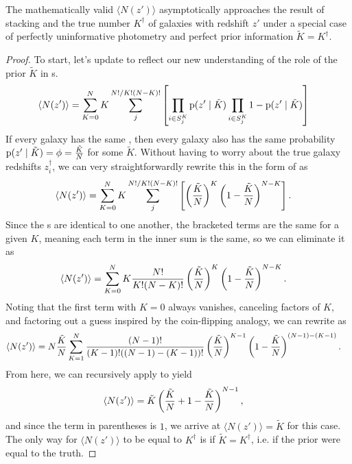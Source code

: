 \begin{theorem}
	\label{thm:uninformative}
	The mathematically valid $\langle N(z') \rangle$ asymptotically approaches the result of stacking and the true number $K^{\dagger}$ of galaxies with redshift $z'$ under a special case of perfectly uninformative photometry and perfect prior information $\tilde{K} = K^{\dagger}$.
\end{theorem}
\begin{proof}
	To start, let's update  to reflect our new understanding of the role of the prior $\tilde{K}$ in \pzpdf s.
	\begin{align}
	\label{eqn:proofwithprior1}
	\langle N(z') \rangle &= \sum_{K = 0}^{N} K \sum_{j}^{N! / K! (N - K)!} \left[ \prod_{i \in S^{K}_{j}} \mathrm{p}(z' \mid \tilde{K}) \prod_{i \in S^{K}_{j}} 1 - \mathrm{p}(z' \mid \tilde{K}) \right]
	\end{align}
	If every galaxy has the same \pzpdf, then every galaxy also has the same probability $\mathrm{p}(z' \mid \tilde{K}) = \phi = \frac{\tilde{K}}{N}$ for some $\tilde{K}$.
	Without having to worry about the true galaxy redshifts $z^{\dagger}_{i}$, we can very straightforwardly rewrite this in the form of  as
	\begin{align}
	\eqlabel{eqn:proofwithprior2}
	\langle N(z') \rangle &= \sum_{K = 0}^{N} K \sum_{j}^{N! / K! (N - K)!} \left[ \left(\frac{\tilde{K}}{N}\right)^{K} \left(1 - \frac{\tilde{K}}{N}\right)^{N - K} \right] .
	\end{align}
	Since the \pzpdf s are identical to one another, the bracketed terms are the same for a given $K$, meaning each term in the inner sum is the same, so we can eliminate it as 
	\begin{align}
	\eqlabel{eqn:proofwithprior3}
	\langle N(z') \rangle &= \sum_{K = 0}^{N} K \frac{N!}{K! (N - K)!} \left(\frac{\tilde{K}}{N}\right)^{K} \left(1 - \frac{\tilde{K}}{N}\right)^{N - K} .
	\end{align}
	Noting that the first term with $K = 0$ always vanishes, canceling factors of $K$, and factoring out a guess inspired by the coin-flipping analogy, we can rewrite  as
	\begin{align}
	\eqlabel{eqn:proofwithprior4}
	\langle N(z') \rangle &= N \frac{\tilde{K}}{N} \sum_{K = 1}^{N} \frac{(N - 1)!}{(K - 1)! ((N - 1) - (K - 1))!} \left(\frac{\tilde{K}}{N}\right)^{K - 1} \left(1 - \frac{\tilde{K}}{N}\right)^{(N - 1) - (K - 1)} .
	\end{align}
	From here, we can recursively apply  to yield
	\begin{align}
	\eqlabel{eqn:proofwithprior5}
	\langle N(z') \rangle &= \tilde{K} \left(\frac{\tilde{K}}{N} + 1 - \frac{\tilde{K}}{N}\right)^{N - 1} ,
	\end{align}
	and since the term in parentheses is $1$, we arrive at $\langle N(z') \rangle = \tilde{K}$ for this case.
	The only way for $\langle N(z') \rangle$ to be equal to $K^{\dagger}$ is if $\tilde{K} = K^{\dagger}$, i.e. if the prior were equal to the truth.
\end{proof}

